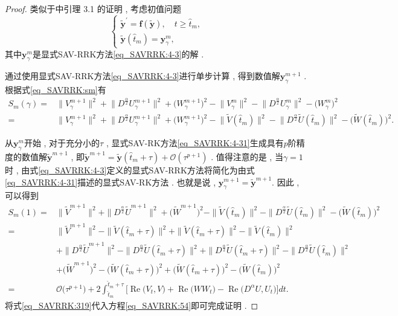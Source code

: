 \begin{proof}
类似于\citep{liImplicitexplicitRelaxationRungeKutta2022}中引理 3.1 的证明 , 
考虑初值问题
\begin{equation}
\left\{\begin{array}{l}
\tilde{\bm{y}}^{\prime}=\bm{f}(\tilde{\bm{y}}) , \quad t \geq \hat{t}_m , \\
\tilde{\bm{y}}\left(\hat{t}_m\right)=\bm{y}_\gamma^m , 
\end{array}\right . 
\end{equation}
其中$\bm{y}_\gamma^m$是显式SAV-RRK方法\eqref{eq_SAVRRK:4-3}的解 . 

通过使用显式SAV-RRK方法\eqref{eq_SAVRRK:4-3}进行单步计算 , 得到数值解$\bm{y}_\gamma^{m+1}$ . 根据式\eqref{eq_SAVRRK:sm}有
\begin{equation}
\begin{aligned}
S_m(\gamma) \!=& \|V_\gamma^{m+1}\|^2 \!+\! \|D^\frac{\alpha}{2} U_\gamma^{m+1}\|^2\!+\!\big(W_\gamma^{m+1}\big)^2\!-\!\|V_\gamma^{m}\|^2 \!-\! \|D^\frac{\alpha}{2} U_\gamma^{m}\|^2\!-\!\big(W_\gamma^{m}\big)^2\\
\!=& \|V_\gamma^{m+1}\|^2 \!+\! \|D^\frac{\alpha}{2} U_\gamma^{m+1}\|^2\!+\!\big(W_\gamma^{m+1}\big)^2\!-\!\|\tilde{V}(\hat{t}_{m})\|^2 \!-\! \|D^\frac{\alpha}{2} \tilde{U}(\hat{t}_{m})\|^2\!-\!\big(\tilde{W}(\hat{t}_{m})\big)^2 . 
\end{aligned}
\end{equation}

从$\bm{y}_\gamma^m$开始 , 对于充分小的$\tau$ , 显式SAV-RK方法\eqref{eq_SAVRRK:4-31}生成具有$p$阶精度的数值解$\tilde{\bm{y}}^{m+1}$ , 
即$\tilde{\bm{y}}^{m+1}=\tilde{\bm{y}}\left(\hat{t}_m+\tau\right)+\mathcal{O}\left(\tau^{p+1}\right)$ . 
值得注意的是 , 当$\gamma=1$时 , 由式\eqref{eq_SAVRRK:4-3}定义的显式SAV-RRK方法将简化为由式\eqref{eq_SAVRRK:4-31}描述的显式SAV-RK方法 . 也就是说 , $\bm{y}_\gamma^{m +1}=\tilde{\bm{y}}^{m +1} .$ 因此 , 可以得到
\begin{align}
S_m(1) = &\|\tilde{V}^{m+1}\|^2 + \|D^\frac{\alpha}{2} \tilde{U}^{m+1}\|^2+\big(\tilde{W}^{m+1}\big)^2-\|\tilde{V}(\hat{t}_{m})\|^2 - \|D^\frac{\alpha}{2} \tilde{U}(\hat{t}_{m})\|^2-\big(\tilde{W}(\hat{t}_{m})\big)^2 \nonumber\\
= &\|\tilde{V}^{m+1}\|^2 -\|\tilde{V}(\hat{t}_{m}+\tau)\|^2 +\|\tilde{V}(\hat{t}_{m}+\tau)\|^2-\|\tilde{V}(\hat{t}_{m})\|^2\nonumber\\
& + \|D^\frac{\alpha}{2} \tilde{U}^{m+1}\|^2 -\|D^\frac{\alpha}{2} \tilde{U}(\hat{t}_{m}+\tau)\|^2+\|D^\frac{\alpha}{2} \tilde{U}(\hat{t}_{m}+\tau)\|^2- \|D^\frac{\alpha}{2} \tilde{U}(\hat{t}_{m})\|^2\nonumber\\
& +\big(\tilde{W}^{m+1}\big)^2 -\big(\tilde{W}(\hat{t}_{m}+\tau)\big)^2+\big(\tilde{W}(\hat{t}_{m}+\tau)\big)^2-\big(\tilde{W}(\hat{t}_{m})\big)^2 \nonumber\\
= &\mathcal{O}\big(\tau^{p+1}\big) +2\int_{\hat{t}_m}^{\hat{t}_m+\tau}\big[\operatorname{Re}\big(V_t , V\big) + \operatorname{Re}\big(W W_t\big) - \operatorname{Re}\big(D^{\alpha} U , U_t\big)\big]dt . \label{eq_SAVRRK:54}
\end{align}
将式\eqref{eq_SAVRRK:319}代入方程\eqref{eq_SAVRRK:54}即可完成证明 . 


\end{proof}
